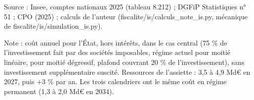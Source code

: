 Source : Insee, comptes nationaux 2025 (tableau 8.212) ; DGFiP Statistiques n° 51 ; CPO (2025) ; calculs de l'auteur (fiscalite/is/calculs\_note\_is.py, mécanique de fiscalite/is/simulation\_is.py).\par Note : coût annuel pour l'État, hors intérêts, dans le cas central (75 \% de l'investissement fait par des sociétés imposables, régime actuel pour moitié linéaire, pour moitié dégressif, plafond couvrant 20 \% de l'investissement), sans investissement supplémentaire suscité. Ressources de l'assiette : 3,5 à 4,9 Md\euro{} en 2027, puis +3 \% par an. Les trois calendriers ont le même coût en régime permanent (1,3 à 2,0 Md\euro{} en 2034).
